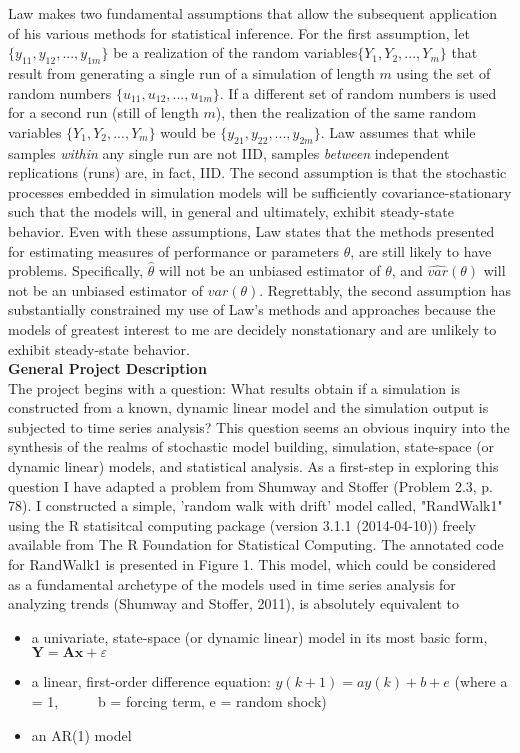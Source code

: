 \documentclass[a4paper,11pt]{article}
\begin{document}
Law makes two fundamental assumptions that allow the subsequent application of his various methods for statistical inference. For the first assumption, let $\{ y_{11}, y_{12}, ..., y_{1m}\} $ be a realization of the random variables$\{ Y_{1}, Y_{2}, ..., Y_{m}\} $ that result from generating a single run of a simulation of length $ m $ using the set of random numbers $ \{ u_{11}, u_{12}, ..., u_{1m}\} $. If a different set of random numbers is used for a second run (still of length $ m $), then the realization of the same random variables $\{ Y_{1}, Y_{2}, ..., Y_{m}\} $ would be $\{ y_{21}, y_{22}, ..., y_{2m}\} $. Law assumes that while samples \textit{within} any single run are not IID, samples \textit{between} independent replications (runs) are, in fact, IID. The second assumption is that the stochastic processes embedded in simulation models will be sufficiently covariance-stationary such that the models will, in general and ultimately, exhibit steady-state behavior. Even with these assumptions, Law states that the methods presented for estimating measures of performance or parameters $ \theta $, are still likely to have problems. Specifically, $ \hat{\theta }$ will not be an unbiased estimator of $ \theta $, and $ \hat{var}(\theta) $ will not be an unbiased estimator of $ var(\theta )$. Regrettably, the second assumption has substantially constrained my use of Law's methods and approaches because the models of greatest interest to me are decidely nonstationary and are unlikely to exhibit steady-state behavior.\\

\textbf{General Project Description}\\

The project begins with a question: What results obtain if a simulation is constructed from a known, dynamic linear model and the simulation output is subjected to time series analysis? This question seems an obvious inquiry into the synthesis of the realms of stochastic model building, simulation, state-space (or dynamic linear) models, and statistical analysis.  As a first-step in exploring this question I have adapted a problem from Shumway and Stoffer (Problem 2.3, p. 78).  I constructed a simple, 'random walk with drift' model called, "RandWalk1" using the R statisitcal computing package (version 3.1.1 (2014-04-10)) freely available from The R Foundation for Statistical Computing. The annotated code for RandWalk1 is presented in Figure 1. This model, which could be considered as a fundamental archetype of the models used in time series analysis for analyzing trends (Shumway and Stoffer, 2011), is absolutely equivalent to
\begin{itemize}
  \item a univariate, state-space (or dynamic linear) model in its most basic form, $ \textbf{Y}= \textbf{A}\textbf{x} + \varepsilon $
  \item a linear, first-order difference equation: $ y(k+1) = ay(k) + b + e $ (where a = 1, \ \ \ \ \ b = forcing term, e = random shock)
  \item an AR(1) model
\end{itemize}
\end{document}
